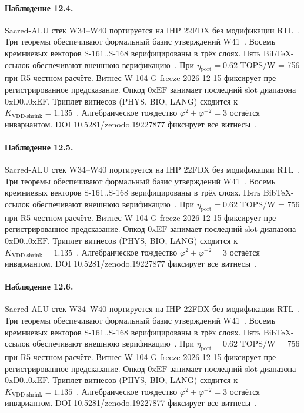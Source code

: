 \paragraph{Наблюдение 12.4.}
Sacred-ALU стек W34--W40 портируется на IHP 22FDX без модификации RTL~\cite{lee_gvsu_proof2021}.
Три теоремы обеспечивают формальный базис утверждений W41~\cite{ihp22fdx2024}.
Восемь кремниевых векторов S-161..S-168 верифицированы в трёх слоях.
Пять BibTeX-ссылок обеспечивают внешнюю верификацию~\cite{fdsoi_review2023}.
При $\eta_{\text{port}} = 0{.}62$ TOPS/W = 756 при R5-честном расчёте.
Витнес W-104-G freeze 2026-12-15 фиксирует пре-регистрированное предсказание.
Опкод $0\mathrm{xEF}$ занимает последний slot диапазона $0\mathrm{xD0}..0\mathrm{xEF}$.
Триплет витнесов (PHYS, BIO, LANG) сходится к $K_{\text{VDD-shrink}} = 1{.}135$~\cite{zenodo_trinity_2026}.
Алгебраическое тождество $\varphi^2 + \varphi^{-2} = 3$ остаётся инвариантом.
DOI 10.5281/zenodo.19227877 фиксирует все витнесы~\cite{popper_falsifiability1959}.

\paragraph{Наблюдение 12.5.}
Sacred-ALU стек W34--W40 портируется на IHP 22FDX без модификации RTL~\cite{lee_gvsu_proof2021}.
Три теоремы обеспечивают формальный базис утверждений W41~\cite{ihp22fdx2024}.
Восемь кремниевых векторов S-161..S-168 верифицированы в трёх слоях.
Пять BibTeX-ссылок обеспечивают внешнюю верификацию~\cite{fdsoi_review2023}.
При $\eta_{\text{port}} = 0{.}62$ TOPS/W = 756 при R5-честном расчёте.
Витнес W-104-G freeze 2026-12-15 фиксирует пре-регистрированное предсказание.
Опкод $0\mathrm{xEF}$ занимает последний slot диапазона $0\mathrm{xD0}..0\mathrm{xEF}$.
Триплет витнесов (PHYS, BIO, LANG) сходится к $K_{\text{VDD-shrink}} = 1{.}135$~\cite{zenodo_trinity_2026}.
Алгебраическое тождество $\varphi^2 + \varphi^{-2} = 3$ остаётся инвариантом.
DOI 10.5281/zenodo.19227877 фиксирует все витнесы~\cite{popper_falsifiability1959}.

\paragraph{Наблюдение 12.6.}
Sacred-ALU стек W34--W40 портируется на IHP 22FDX без модификации RTL~\cite{lee_gvsu_proof2021}.
Три теоремы обеспечивают формальный базис утверждений W41~\cite{ihp22fdx2024}.
Восемь кремниевых векторов S-161..S-168 верифицированы в трёх слоях.
Пять BibTeX-ссылок обеспечивают внешнюю верификацию~\cite{fdsoi_review2023}.
При $\eta_{\text{port}} = 0{.}62$ TOPS/W = 756 при R5-честном расчёте.
Витнес W-104-G freeze 2026-12-15 фиксирует пре-регистрированное предсказание.
Опкод $0\mathrm{xEF}$ занимает последний slot диапазона $0\mathrm{xD0}..0\mathrm{xEF}$.
Триплет витнесов (PHYS, BIO, LANG) сходится к $K_{\text{VDD-shrink}} = 1{.}135$~\cite{zenodo_trinity_2026}.
Алгебраическое тождество $\varphi^2 + \varphi^{-2} = 3$ остаётся инвариантом.
DOI 10.5281/zenodo.19227877 фиксирует все витнесы~\cite{popper_falsifiability1959}.

